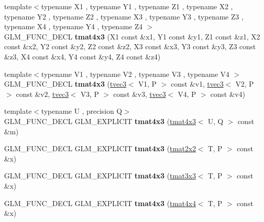 \begin{DoxyCompactItemize}
{\footnotesize template$<$typename X1 , typename Y1 , typename Z1 , typename X2 , typename Y2 , typename Z2 , typename X3 , typename Y3 , typename Z3 , typename X4 , typename Y4 , typename Z4 $>$ }\\G\+L\+M\+\_\+\+F\+U\+N\+C\+\_\+\+D\+E\+CL {\bfseries tmat4x3} (X1 const \&x1, Y1 const \&y1, Z1 const \&z1, X2 const \&x2, Y2 const \&y2, Z2 const \&z2, X3 const \&x3, Y3 const \&y3, Z3 const \&z3, X4 const \&x4, Y4 const \&y4, Z4 const \&z4)
\item 
\mbox{\label{structglm_1_1tmat4x3_a69caec1d2cb2b9320817a1323211d94d}} 
{\footnotesize template$<$typename V1 , typename V2 , typename V3 , typename V4 $>$ }\\G\+L\+M\+\_\+\+F\+U\+N\+C\+\_\+\+D\+E\+CL {\bfseries tmat4x3} (\hyperlink{structglm_1_1tvec3}{tvec3}$<$ V1, P $>$ const \&v1, \hyperlink{structglm_1_1tvec3}{tvec3}$<$ V2, P $>$ const \&v2, \hyperlink{structglm_1_1tvec3}{tvec3}$<$ V3, P $>$ const \&v3, \hyperlink{structglm_1_1tvec3}{tvec3}$<$ V4, P $>$ const \&v4)
\item 
\mbox{\label{structglm_1_1tmat4x3_aa0103a8d29b63892bf75c1f28cccfe23}} 
{\footnotesize template$<$typename U , precision Q$>$ }\\G\+L\+M\+\_\+\+F\+U\+N\+C\+\_\+\+D\+E\+CL G\+L\+M\+\_\+\+E\+X\+P\+L\+I\+C\+IT {\bfseries tmat4x3} (\hyperlink{structglm_1_1tmat4x3}{tmat4x3}$<$ U, Q $>$ const \&m)
\item 
\mbox{\label{structglm_1_1tmat4x3_a0a7982fe88164b1cc7ae9ddac2b62ac0}} 
G\+L\+M\+\_\+\+F\+U\+N\+C\+\_\+\+D\+E\+CL G\+L\+M\+\_\+\+E\+X\+P\+L\+I\+C\+IT {\bfseries tmat4x3} (\hyperlink{structglm_1_1tmat2x2}{tmat2x2}$<$ T, P $>$ const \&x)
\item 
\mbox{\label{structglm_1_1tmat4x3_a28c08dee803c5fb0fe8c2c824f58681d}} 
G\+L\+M\+\_\+\+F\+U\+N\+C\+\_\+\+D\+E\+CL G\+L\+M\+\_\+\+E\+X\+P\+L\+I\+C\+IT {\bfseries tmat4x3} (\hyperlink{structglm_1_1tmat3x3}{tmat3x3}$<$ T, P $>$ const \&x)
\item 
\mbox{\label{structglm_1_1tmat4x3_ad5011e7aaaeddf6ca91742217d07a8d2}} 
G\+L\+M\+\_\+\+F\+U\+N\+C\+\_\+\+D\+E\+CL G\+L\+M\+\_\+\+E\+X\+P\+L\+I\+C\+IT {\bfseries tmat4x3} (\hyperlink{structglm_1_1tmat4x4}{tmat4x4}$<$ T, P $>$ const \&x)

\end{DoxyCompactItemize}
